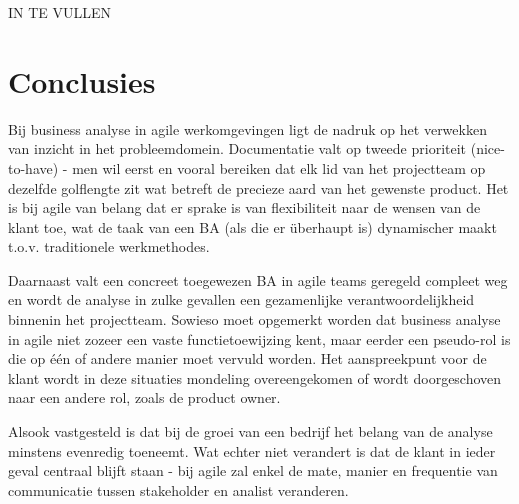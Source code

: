 \documentclass{hogent-article}
\begin{document}
\vspace{5pt}

IN TE VULLEN

\section{Conclusies}

Bij business analyse in agile werkomgevingen ligt de nadruk op het verwekken van inzicht in het probleemdomein. Documentatie valt
op tweede prioriteit (nice-to-have) - men wil eerst en vooral bereiken dat elk lid van het projectteam op dezelfde golflengte zit wat betreft de 
precieze aard van het gewenste product. Het is bij agile van belang dat er sprake is van flexibiliteit naar de wensen van de klant toe, wat de taak van een BA
(als die er überhaupt is) dynamischer maakt t.o.v. traditionele werkmethodes.

Daarnaast valt een concreet toegewezen BA in agile teams geregeld compleet weg en wordt de analyse in zulke gevallen
een gezamenlijke verantwoordelijkheid binnenin het projectteam. Sowieso moet opgemerkt worden dat business analyse in agile niet zozeer een 
vaste functietoewijzing kent, maar eerder een pseudo-rol is die op één of andere manier moet vervuld worden. Het aanspreekpunt voor de klant wordt in deze
situaties mondeling overeengekomen of wordt doorgeschoven naar een andere rol, zoals de product owner.

Alsook vastgesteld is dat bij de groei van een bedrijf het belang van de analyse minstens evenredig toeneemt. Wat echter niet verandert is dat de klant
in ieder geval centraal blijft staan - bij agile zal enkel de mate, manier en frequentie van communicatie tussen stakeholder en analist veranderen.


\printbibliography[heading=bibintoc]
\end{document}
